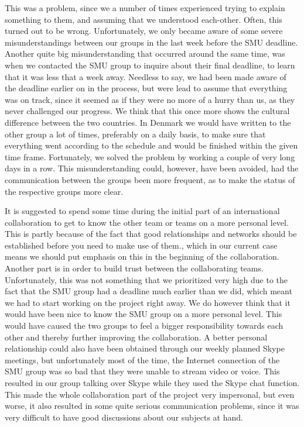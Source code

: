 This was a problem, since we a number of times experienced trying to explain something to them, and assuming that we understood each-other. Often, this turned out to be wrong. Unfortunately, we only became aware of some severe misunderstandings between our groups in the last week before the SMU deadline. Another quite big misunderstanding that occurred around the same time, was when we contacted the SMU group to inquire about their final deadline, to learn that it was less that a week away. Needless to say, we had been made aware of the deadline earlier on in the process, but were lead to assume that everything was on track, since it seemed as if they were no more of a hurry than us, as they never challenged our progress. We think that this once more shows the cultural difference between the two countries. In Denmark we would have written to the other group a lot of times, preferably on a daily basis, to make sure that everything went according to the schedule and would be finished within the given time frame. Fortunately, we solved the problem by working a couple of very long days in a row. This misunderstanding could, however, have been avoided, had the communication between the groups been more frequent, as to make the status of the respective groups more clear.

It is suggested \cite{NH} to spend some time during the initial part of an international collaboration to get to know the other team or teams on a more personal level. This is partly because of the fact that good relationships and networks should be established before you need to make use of them., which in our current case means we should put emphasis on this in the beginning of the collaboration. Another part is in order to build trust between the collaborating teams. Unfortunately, this was not something that we prioritized very high due to the fact that the SMU group had a deadline much earlier than we did, which meant we had to start working on the project right away. We do however think that it would have been nice to know the SMU group on a more personal level. This would have caused the two groups to feel a bigger responsibility towards each other and thereby further improving the collaboration. A better personal relationship could also have been obtained through our weekly planned Skype meetings, but unfortunately most of the time, the Internet connection of the SMU group was so bad that they were unable to stream video or voice. This resulted in our group talking over Skype while they used the Skype chat function. This made the whole collaboration part of the project very impersonal, but even worse, it also resulted in some quite serious communication problems, since it was very difficult to have good discussions about our subjects at hand.


